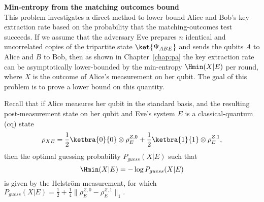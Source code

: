 \begin{exercises}

\item {\bf Min-entropy from the matching outcomes bound}\label{ex:matching-min}\\
This problem investigates a direct method to lower bound Alice and Bob's key extraction rate based on the probability that the matching-outcomes test succeeds. If we assume that the adversary Eve prepares $n$ identical and uncorrelated copies of the tripartite state $\ket{\Psi_{ABE}}$ and sends the qubits $A$ to Alice and $B$ to Bob, then as shown in Chapter~\ref{chap:pa} the key extraction rate can be asymptotically lower-bounded by the min-entropy $\Hmin(X|E)$ per round, where $X$ is the outcome of Alice's measurement on her qubit. The goal of this problem is to prove a lower bound on this quantity.

Recall that if Alice measures her qubit in the standard basis, and the resulting post-measurement state on her qubit and Eve's system $E$ is a classical-quantum (cq) state
$$\rho_{XE} = \frac{1}{2}\ketbra{0}{0} \otimes \rho_E^{Z,0}+\frac{1}{2}\ketbra{1}{1} \otimes \rho_E^{Z,1},$$
then the optimal guessing probability $P_{guess}(X|E)$ such that
$$\Hmin(X|E) = - \log P_{guess}(X|E)$$
is given by the Helstr\"om measurement, for which
$P_{guess}(X|E) = \frac{1}{2}+\frac{1}{4}\|\rho_E^{Z,0}-\rho_E^{Z,1}\|_1.$


\end{exercises}
